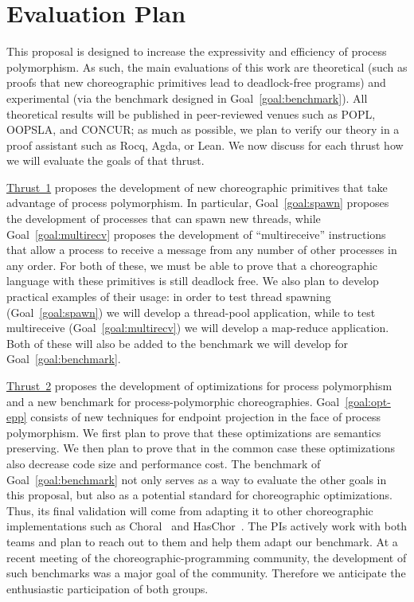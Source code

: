 \section{Evaluation Plan}
\label{sec:eval}

This proposal is designed to increase the expressivity and efficiency of process polymorphism.
As such, the main evaluations of this work are theoretical (such as proofs that new choreographic primitives lead to deadlock-free programs) and experimental (via the benchmark designed in Goal~\ref{goal:benchmark}).
All theoretical results will be published in peer-reviewed venues such as POPL, OOPSLA, and CONCUR; as much as possible, we plan to verify our theory in a proof assistant such as Rocq, Agda, or Lean.
We now discuss for each thrust how we will evaluate the goals of that thrust.

\hyperref[sec:t1]{Thrust~1} proposes the development of new choreographic primitives that take advantage of process polymorphism.
In particular, Goal~\ref{goal:spawn} proposes the development of processes that can spawn new threads, while Goal~\ref{goal:multirecv} proposes the development of ``multireceive'' instructions that allow a process to receive a message from any number of other processes in any order.
For both of these, we must be able to prove that a choreographic language with these primitives is still deadlock free.
We also plan to develop practical examples of their usage: in order to test thread spawning (Goal~\ref{goal:spawn}) we will develop a thread-pool application, while to test multireceive (Goal~\ref{goal:multirecv}) we will develop a map-reduce application.
Both of these will also be added to the benchmark we will develop for Goal~\ref{goal:benchmark}.

\hyperref[sec:t2]{Thrust~2} proposes the development of optimizations for process polymorphism and a new benchmark for process-polymorphic choreographies.
Goal~\ref{goal:opt-epp} consists of new techniques for endpoint projection in the face of process polymorphism.
We first plan to prove that these optimizations are semantics preserving.
We then plan to prove that in the common case these optimizations also decrease code size and performance cost.
The benchmark of Goal~\ref{goal:benchmark} not only serves as a way to evaluate the other goals in this proposal, but also as a potential standard for choreographic optimizations.
Thus, its final validation will come from adapting it to other choreographic implementations such as Choral~\cite{GiallorenzoMP24} and HasChor~\cite{ShenKK23,BatesK+25}.
The PIs actively work with both teams and plan to reach out to them and help them adapt our benchmark.
At a recent meeting of the choreographic-programming community, the development of such benchmarks was a major goal of the community.
Therefore we anticipate the enthusiastic participation of both groups.

